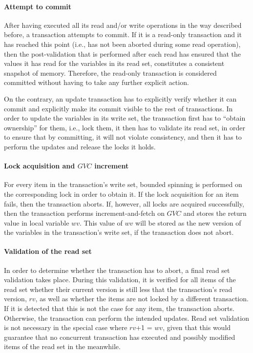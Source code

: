 \documentclass[11pt,letterpaper]{article}
\begin{document}
\paragraph{Attempt to commit}
After  having executed  all its  read and/or  write operations  in  the way
described before, a transaction attempts  
to commit. If  it is a read-only transaction and it  has reached this point
(i.e., has not been aborted during some  
read operation), then the post-validation that is performed after each read
has ensured that the values it has  
read for the  variables in its read set,  constitutes a consistent snapshot
of memory. Therefore, the read-only  
transaction  is considered  committed without  having to  take  any further
explicit action. 

On the contrary, an update  transaction has to explicitly verify whether it
can commit and explicitly make its  
commit  visible  to  the rest  of  transactions.  In  order to  update  the
variables in its write set, the transaction first  
has to  {}``obtain ownership'' for  them, i.e., lock  them, it then  has to
validate its read set, in order to ensure that  
by committing, it will not violate  consistency, and then it has to perform
the updates and release the locks it  
holds. 

\paragraph{Lock acquisition and $\mathit{GVC}$ increment} 
For  every item  in  the  transaction{}'s write  set,  bounded spinning  is
performed on the corresponding lock in order  
to  obtain  it.  If the  lock  acquisition  for  an  item fails,  then  the
transaction aborts. If, however, all locks are acquired  
successfully,   then  the   transaction  performs   increment-and-fetch  on
$\mathit{GVC}$ and stores the return value in  
local variable $\mathit{wv}$. This value of $\mathit{wv}$ will be stored as
the new version of the variables in the  
transaction's write set, if the transaction does not abort.

\paragraph{Validation of the read set}
In order  to determine whether the  transaction has to abort,  a final read
set validation takes place. During this  
validation, it  is verified  for all  items of the  read set  whether their
current version is still less that the transaction's  
read version, $\mathit{rv}$, as well as whether the items are not locked by
a different transaction. If it is detected  
that this is not the case  for any item, the transaction aborts. Otherwise,
the transaction can perform the intended  
updates. Read  set validation  is not necessary  in the special  case where
$\mathit{rv}$+1 = $\mathit{wv}$, given  
that this would  guarantee that no concurrent transaction  has executed and
possibly modified items of the read   set in the meanwhile.
\end{document}
